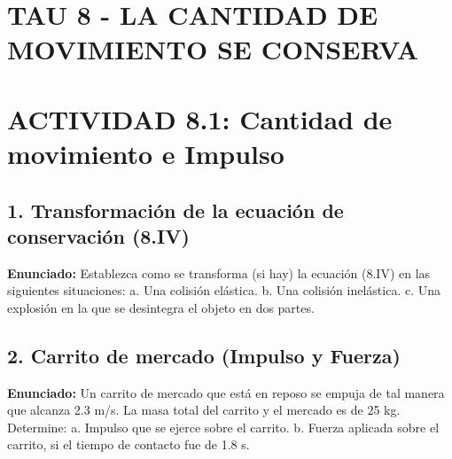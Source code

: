 \documentclass[12pt, letterpaper]{article}
\begin{document}
	\section*{TAU 8 - LA CANTIDAD DE MOVIMIENTO SE CONSERVA}
	
	\section*{ACTIVIDAD 8.1: Cantidad de movimiento e Impulso}
	
	\subsection*{1. Transformación de la ecuación de conservación (8.IV)}
	\noindent \textbf{Enunciado:} Establezca como se transforma (si hay) la ecuación (8.IV) en las siguientes situaciones: a. Una colisión elástica. b. Una colisión inelástica. c. Una explosión en la que se desintegra el objeto en dos partes.
	
	
	\subsection*{2. Carrito de mercado (Impulso y Fuerza)}
	\noindent \textbf{Enunciado:} Un carrito de mercado que está en reposo se empuja de tal manera que alcanza 2.3 m/s. La masa total del carrito y el mercado es de 25 kg. Determine: a. Impulso que se ejerce sobre el carrito. b. Fuerza aplicada sobre el carrito, si el tiempo de contacto fue de 1.8 s.
	
\end{document}
